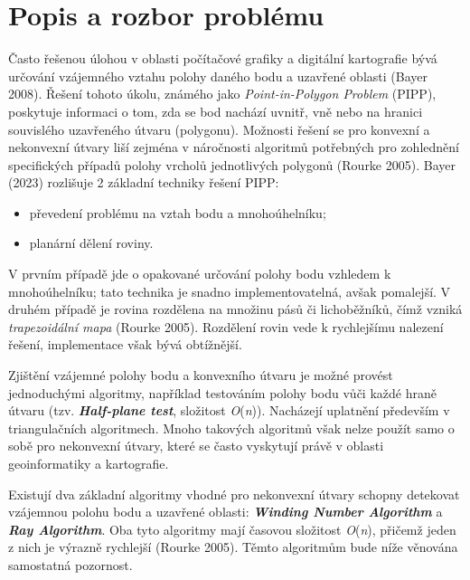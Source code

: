 \chapter*{Popis a rozbor problému }

\par Často řešenou úlohou v oblasti počítačové grafiky a digitální kartografie bývá určování vzájemného vztahu polohy daného bodu a uzavřené oblasti (Bayer 2008). Řešení tohoto úkolu, známého jako \emph{Point-in-Polygon Problem} (PIPP), poskytuje informaci o tom, zda se bod nachází uvnitř, vně nebo na hranici souvislého uzavřeného útvaru (polygonu). Možnosti řešení se pro konvexní a nekonvexní útvary liší zejména v náročnosti algoritmů potřebných pro zohlednění specifických případů polohy vrcholů jednotlivých polygonů (Rourke 2005). Bayer (2023) rozlišuje 2 základní techniky řešení PIPP:

\begin{itemize}
  \item převedení problému na vztah bodu a mnohoúhelníku; 
  \item planární dělení roviny.
\end{itemize}

\par V prvním případě jde o opakované určování polohy bodu vzhledem k mnohoúhelníku; tato technika je snadno implementovatelná, avšak pomalejší. V druhém případě je rovina rozdělena na množinu pásů či lichoběžníků, čímž vzniká \emph{trapezoidální mapa} (Rourke 2005). Rozdělení rovin vede k rychlejšímu nalezení řešení, implementace však bývá obtížnější.
\par Zjištění vzájemné polohy bodu a konvexního útvaru je možné provést jednoduchými algoritmy, například testováním polohy bodu vůči každé hraně útvaru (tzv. \textbf{\emph{Half-plane test}}, složitost \emph{O}(\emph{n})). Nacházejí uplatnění především v triangulačních algoritmech. Mnoho takových algoritmů však nelze použít samo o sobě pro nekonvexní útvary, které se často vyskytují právě v oblasti geoinformatiky a kartografie.
\par Existují dva základní algoritmy vhodné pro nekonvexní útvary schopny detekovat vzájemnou polohu bodu a uzavřené oblasti: \textbf{\emph{Winding Number Algorithm}} a \textbf{\emph{Ray Algorithm}}. Oba tyto algoritmy mají časovou složitost \emph{O}(\emph{n}), přičemž jeden z nich je výrazně rychlejší (Rourke 2005). Těmto algoritmům bude níže věnována samostatná pozornost.

\bigbreak

